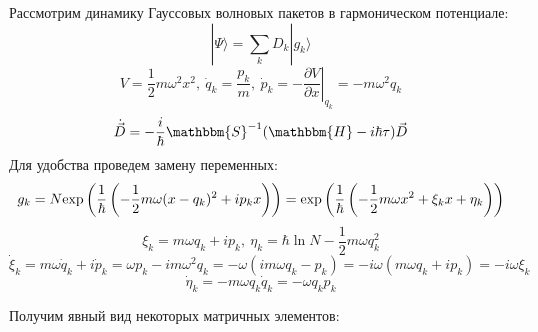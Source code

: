 Рассмотрим динамику Гауссовых волновых пакетов в гармоническом потенциале:
$$|\Psi\rangle = \sum_k D_k|g_k\rangle$$
$$V = \frac{1}{2}m\omega^2x^2,\ \dot{q}_k=\frac{p_k}{m},\ \dot{p}_k=-\left.\frac{\partial V}{\partial x}\right|_{q_k}=-m\omega^2q_k $$
$$\dot{\vec{D}} = -\frac{i}{\hbar}\mathbbm{S}^{-1}(\mathbbm{H}-i\hbar\tau)\vec{D}$$
Для удобства проведем замену переменных:
$$g_k=N\myexp{\frac{1}{\hbar}\left(-\frac{1}{2}m\omega(x-q_k)^2+ip_kx\right)}=%
       \myexp{\frac{1}{\hbar}\left(-\frac{1}{2}m\omega x^2 + \xi_kx + \eta_k\right)}$$
$$\xi_k=m\omega q_k+ip_k,\ \eta_k=\hbar\ln N-\frac{1}{2}m\omega q_k^2$$
$$\dot{\xi}_k=m\omega\dot{q}_k+i\dot{p}_k=\omega p_k-im\omega^2q_k=-\omega(im\omega q_k - p_k)=-i\omega(m\omega q_k+ip_k)=-i\omega\xi_k$$
$$\dot{\eta}_k=-m\omega q_k\dot{q}_k=-\omega q_kp_k$$

Получим явный вид некоторых матричных элементов:
